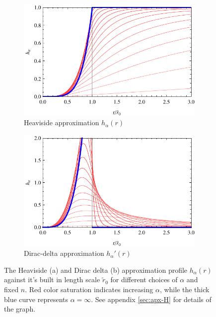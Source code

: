 \documentclass[12pt,a4paper]{report}
\numberwithin{equation}{chapter}
\begin{document}
\begin{figure}[b!]
\centering
\begin{subfigure}{0.5\textwidth}
\caption{Heaviside approximation $h_\alpha(r)$}
\label{fig:profile-halpha}%
\includegraphics[width=\textwidth]{figures/profile-halpha.pdf}
\end{subfigure}%
\begin{subfigure}{0.5\textwidth}
\caption{Dirac-delta approximation $h_\alpha'(r)$}
\label{fig:dirac-halpha}%
\includegraphics[width=\textwidth]{figures/dirac-profile-halpha.pdf}
\end{subfigure}%
\caption[Plots of the self-regular function $h_\alpha(r)$ and its derivative.]{The Heaviside (a) and Dirac delta (b) approximation profile $h_\alpha(r)$ against it's built in length scale $\tilde r_0$ for different choices of $\alpha$ and fixed $n$. Red color saturation indicates increasing $\alpha$, while the thick blue curve represents $\alpha=\infty$. See appendix \ref{sec:apx-H} for details of the graph.}\label{fig:profiles-halpha}
\end{figure}
\end{document}
